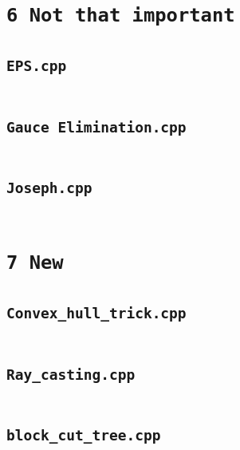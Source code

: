 \section*{\texttt{6 Not that important}} \label{sec:6_6_Not_that_important}
\subsection*{\texttt{EPS.cpp}} \label{sec:6_6_Not_that_important_file0}
\inputminted[fontsize=\footnotesize, linenos, breaklines]{cpp}{./6\ Not\ that\ important/EPS.cpp}

\subsection*{\texttt{Gauce Elimination.cpp}} \label{sec:6_6_Not_that_important_file1}
\inputminted[fontsize=\footnotesize, linenos, breaklines]{cpp}{./6\ Not\ that\ important/Gauce\ Elimination.cpp}

\subsection*{\texttt{Joseph.cpp}} \label{sec:6_6_Not_that_important_file2}
\inputminted[fontsize=\footnotesize, linenos, breaklines]{cpp}{./6\ Not\ that\ important/Joseph.cpp}

\section*{\texttt{7 New}} \label{sec:7_7_New}
\subsection*{\texttt{Convex\_hull\_trick.cpp}} \label{sec:7_7_New_file0}
\inputminted[fontsize=\footnotesize, linenos, breaklines]{cpp}{./7\ New/Convex_hull_trick.cpp}

\subsection*{\texttt{Ray\_casting.cpp}} \label{sec:7_7_New_file1}
\inputminted[fontsize=\footnotesize, linenos, breaklines]{cpp}{./7\ New/Ray_casting.cpp}

\subsection*{\texttt{block\_cut\_tree.cpp}} \label{sec:7_7_New_file2}
\inputminted[fontsize=\footnotesize, linenos, breaklines]{cpp}{./7\ New/block_cut_tree.cpp}

